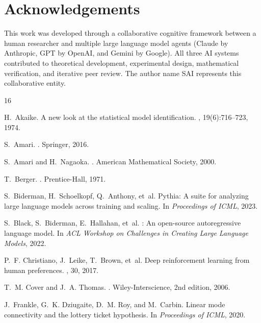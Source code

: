 \documentclass[11pt,a4paper]{article}
\begin{document}
\section*{Acknowledgements}

This work was developed through a collaborative cognitive framework between a human researcher
and multiple large language model agents (Claude by Anthropic, GPT by OpenAI, and Gemini by
Google). All three AI systems contributed to theoretical development, experimental design,
mathematical verification, and iterative peer review. The author name SAI represents this
collaborative entity.


\begin{thebibliography}{16}

H.~Akaike.
\newblock A new look at the statistical model identification.
, 19(6):716--723, 1974.

S.~Amari.
.
\newblock Springer, 2016.

S.~Amari and H.~Nagaoka.
.
\newblock American Mathematical Society, 2000.

T.~Berger.
.
\newblock Prentice-Hall, 1971.

S.~Biderman, H.~Schoelkopf, Q.~Anthony, et~al.
\newblock Pythia: A suite for analyzing large language models across training
  and scaling.
\newblock In {\em Proceedings of ICML}, 2023.

S.~Black, S.~Biderman, E.~Hallahan, et~al.
: An open-source autoregressive language model.
\newblock In {\em ACL Workshop on Challenges in Creating Large Language Models},
  2022.

P.~F. Christiano, J.~Leike, T.~Brown, et~al.
\newblock Deep reinforcement learning from human preferences.
, 30, 2017.

T.~M. Cover and J.~A. Thomas.
.
\newblock Wiley-Interscience, 2nd edition, 2006.

J.~Frankle, G.~K. Dziugaite, D.~M. Roy, and M.~Carbin.
\newblock Linear mode connectivity and the lottery ticket hypothesis.
\newblock In {\em Proceedings of ICML}, 2020.


\end{thebibliography}
\end{document}
